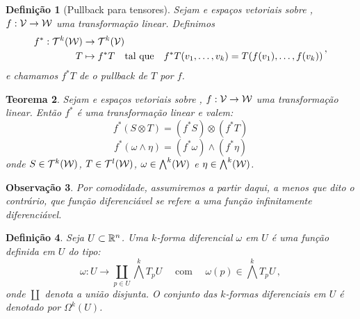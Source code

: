 \documentclass[a4paper,12pt]{extreport}
\newtheorem{mydef}{Definição}
\newtheorem{myobs}[mydef]{Observação}
\newtheorem{myteo}[mydef]{Teorema}
\newif\ifspacesbetweentheos
\newcommand{\theonewpage}{
\ifspacesbetweentheos
  \newpage
\fi
}
\begin{document}
\begin{mydef}[Pullback para tensores]
  Sejam \Vcal{} e \Wcal{} espaços vetoriais sobre \realnumb{},
  $f: \mathcal{V}{} \to \mathcal{W}$ uma transformação linear.
  Definimos
  \begin{equation}
    \begin{split}
      f^*: \mathcal{T}^k(\mathcal{W}) &\to \mathcal{T}^k(\mathcal{V})\\
      T &\mapsto f^*T \quad \text{tal que} \quad
          f^*T(v_1, \dots, v_k) = T(f(v_1), \dots, f(v_k))
    \end{split}\,,
  \end{equation}
  e chamamos $f^*T$ de o \emph{pullback} de $T$ por $f$.
\end{mydef}


\begin{myteo}
  Sejam \Vcal{} e \Wcal{} espaços vetoriais sobre \realnumb{},
  $f: \mathcal{V}{} \to \mathcal{W}$ uma transformação linear.
  Então $f^*$ é uma transformação linear e valem:
  \begin{equation}
    f^*(S \otimes T) = (f^*S) \otimes (f^*T)
  \end{equation}
  \begin{equation}
    f^*(\omega \wedge \eta) = (f^*\omega) \wedge (f^*\eta)
  \end{equation}
  onde
  $S \in \mathcal{T}^k(\mathcal{W})$,
  $T \in \mathcal{T}^l(\mathcal{W})$,
  $\omega  \in \bigwedge^k(\mathcal{W})$
  e $\eta \in \bigwedge^k(\mathcal{W})$.
\end{myteo}  


\theonewpage


\begin{myobs}
  Por comodidade,
  assumiremos a partir daqui, a menos que dito o contrário,
  que \emph{função diferenciável}
  se refere a uma função infinitamente diferenciável.
\end{myobs}


\begin{mydef}
  Seja $U \subset \mathbb{R}^n$. Uma \emph{$k$-forma diferencial} $\omega$ em $U$ é uma função definida em $U$ do tipo:
  \begin{equation}
    \omega : U \to \coprod_{p \in U} \bigwedge^k T_p U
    \quad \text{ com } \quad \omega(p) \in \bigwedge^k T_p U \,,
  \end{equation}
  onde $\coprod$ denota a união disjunta.
  O conjunto das $k$-formas diferenciais em $U$
  é denotado por $\Omega^k(U)$.
\end{mydef}
\end{document}
